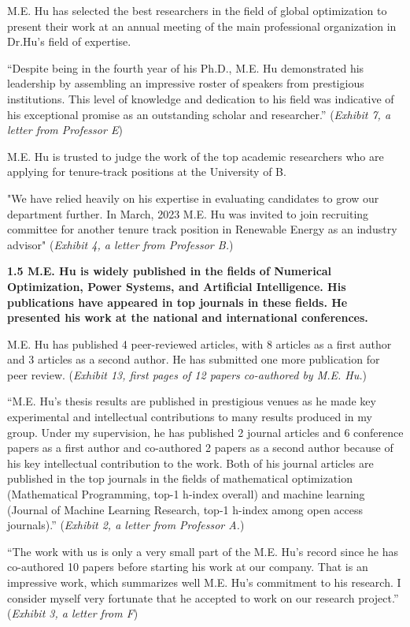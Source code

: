 \documentclass{article}
\begin{document}
M.E. Hu has selected the best researchers in the field of global optimization to present their work at an annual meeting of the main professional organization in Dr.Hu's field of expertise.

“Despite being in the fourth year of his Ph.D., M.E. Hu demonstrated his leadership by assembling an impressive roster of speakers from prestigious institutions. This level of knowledge and dedication to his field was indicative of his exceptional promise as an outstanding scholar and researcher.” ({\it Exhibit 7, a letter from Professor E}) 

M.E. Hu is trusted to judge the work of the top academic researchers who are applying for tenure-track positions at the University of B.

"We have relied heavily on his expertise in evaluating candidates to grow our department further. In March, 2023 M.E. Hu was invited to join recruiting committee for another tenure track position in Renewable Energy as an industry advisor" ({\it Exhibit 4, a letter from Professor B.}) 

{\bf 1.5 M.E. Hu is widely published in the fields of Numerical Optimization, Power Systems, and Artificial Intelligence. His publications have appeared in top journals in these fields. He presented his work at the national and international conferences.}

M.E. Hu has published 4 peer-reviewed articles, with 8 articles as a first author and 3 articles as a second author. He has submitted one more publication for peer review. ({\it Exhibit 13, first pages of 12 papers co-authored by M.E. Hu.}) 

“M.E. Hu’s thesis results are published in prestigious venues as he made key experimental and intellectual contributions to many results produced in my group. Under my supervision, he has published 2 journal articles and 6 conference papers as a first author and co-authored 2 papers as a second author because of his key intellectual contribution to the work. Both of his journal articles are published in the top journals in the fields of mathematical optimization (Mathematical Programming, top-1 h-index overall) and machine learning (Journal of Machine Learning Research, top-1 h-index among open access journals).” ({\it Exhibit 2, a letter from Professor A.}) 

“The work with us is only a very small part of the M.E. Hu’s record since he has co-authored 10 papers before starting his work at our company. That is an impressive work, which summarizes well M.E. Hu’s commitment to his research. I consider myself very fortunate that he accepted to work on our research project.” ({\it Exhibit 3, a letter from F})
\end{document}
